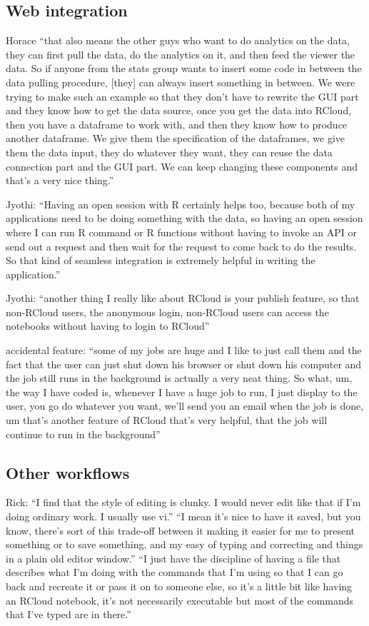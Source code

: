 \subsection{Web integration}
Horace ``that also means the other guys who want to do analytics on the data, they can first pull the data, do the analytics on it, and then feed the viewer the data. So if anyone from the stats group wants to insert some code in between the data pulling procedure, [they] can always insert something in between. We were trying to make such an example so that they don't have to rewrite the GUI part and they know how to get the data source, once you get the data into RCloud, then you have a dataframe to work with, and then they know how to produce another dataframe. We give them the specification of the dataframes, we give them the data input, they do whatever they want, they can reuse the data connection part and the GUI part. We can keep changing these components and that's a very nice thing.''

Jyothi: ``Having an open session with R certainly helps too, because both of my applications need to be doing something with the data, so having an open session where I can run R command or R functions without having to invoke an API or send out a request and then wait for the request to come back to do the results.  So that kind of seamless integration is extremely helpful in writing the application.''

Jyothi: ``another thing I really like about RCloud is your publish feature, so that non-RCloud users, the anonymous login, non-RCloud users can access the notebooks without having to login to RCloud''

accidental feature: ``some of my jobs are huge and I like to just call them and the fact that the user can just shut down his browser or shut down his computer and the job still runs in the background is actually a very neat thing. So what, um, the way I have coded is, whenever I have a huge job to run, I just display to the user, you go do whatever you want, we'll send you an email when the job is done, um that's another feature of RCloud that's very helpful, that the job will continue to run in the background''


\subsection{Other workflows}
Rick: ``I find that the style of editing is clunky. I would never edit like that if I'm doing ordinary work. I usually use vi.'' ``I mean it's nice to have it saved, but you know, there's sort of this trade-off between it making it easier for me to present something or to save something, and my easy of typing and correcting and things in a plain old editor window.'' ``I just have the discipline of having a file that describes what I'm doing with the commands that I'm using so that I can go back and recreate it or pass it on to someone else, so it's a little bit like having an RCloud notebook, it's not necessarily executable but most of the commands that I've typed are in there.''

